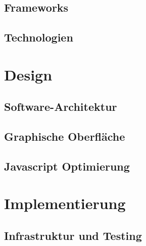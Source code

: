\documentclass[12pt]{article}
\begin{document}
\subsection{Frameworks}
\label{subsec:frameworks}


\newpage

\subsection{Technologien}
\label{subsec:technologien}


\newpage %

\section{Design}
\label{sec:design}


\subsection{Software-Architektur}
\label{subsec:softwarearchitektur}


\newpage

\subsection{Graphische Oberfläche}
\label{subsec:graphischeoberflaeche}


\newpage

\subsection{Javascript Optimierung}
\label{subsec:javascriptoptimierung}


\newpage %

\section{Implementierung}
\label{sec:implementierung}


\subsection{Infrastruktur und Testing}
\label{subsec:infrastrukturtesting}

\end{document}
